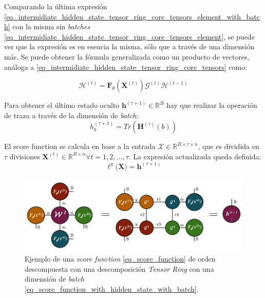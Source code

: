 \documentclass[spanish]{article}
\theoremstyle{definition}
\theoremstyle{remark}
\numberwithin{equation}{section}
\numberwithin{equation}{section} %
\begin{document}
Comparando la última expresión \eqref{eq_intermidiate_hidden_state_tensor_ring_core_tensors_element_with_batch} con la misma sin \textit{batches} \eqref{eq_intermidiate_hidden_state_tensor_ring_core_tensors_element}, se puede ver que la expresión es en esencia la misma, sólo que a través de una dimensión más. Se puede obtener la fórmula generalizada como un producto de vectores, análoga a \eqref{eq_intermidiate_hidden_state_tensor_ring_core_tensors} como: \par
\begin{equation}
\label{eq_intermidiate_hidden_state_tensor_ring_core_tensors_with_batch}
\mathcal{H}^{(t)}  = \boldsymbol{F}_\theta(\boldsymbol{X}^{(t)}) \mathcal{G}^{(t)}  \mathcal{H}^{(t-1)} 
\end{equation} \par
Para obtener el último estado oculto $\boldsymbol{h}^{(\tau+1)}  \in \mathbb{R}^{B}$ hay que realizar la operación de traza a través de la dimensión de \textit{batch}:
\begin{equation}
\label{eq_final_hidden_state_tensor_ring_core_tensors_with_batch_element}
h^{(\tau+1)}_b  = Tr(\boldsymbol{H}^{(\tau)}(b))
\end{equation} \par
El score function se calcula en base a la entrada $\mathcal{X} \in \mathbb{R}^{B \times \tau \times n}$, que es dividida en $\tau$ divisiones  $\boldsymbol{X}^{(t)} \in \mathbb{R}^{B \times n} \forall t=1,2,...,\tau$. La expresión actualizada queda definida:
\begin{equation}
\label{eq_score_function_with_hidden_state_with_batch}
\boldsymbol{\ell}^y\big(\boldsymbol{X}\big) = \boldsymbol{h}^{(\tau+1)}
\end{equation}
\par
\begin{figure}[H]
 \centering
 \includegraphics[width=15cm]{img/ejemplo_score_function_descomposicion_tensor_ring_con_batch.png}
\caption[Ejemplo \textit{score function} con una descomposición \textit{Tensor Ring} con una dimensión de \textit{batch}]{\footnotesize{ Ejemplo de una \textit{score function} \eqref{eq_score_function} de orden descompuesta con una descomposición \textit{Tensor Ring} con una dimensión de \textit{batch} \eqref{eq_score_function_with_hidden_state_with_batch}. }}
\label{fig:score_function_tensor_ring_with_batch}
\end{figure}\par
\end{document}
